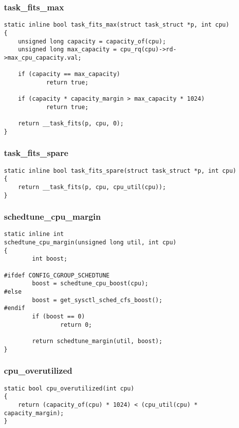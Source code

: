 \documentclass{article}
\begin{document}
\subsubsection{task\_fits\_max}

\begin{verbatim}
static inline bool task_fits_max(struct task_struct *p, int cpu)
{
    unsigned long capacity = capacity_of(cpu);
    unsigned long max_capacity = cpu_rq(cpu)->rd->max_cpu_capacity.val;

    if (capacity == max_capacity)
            return true;

    if (capacity * capacity_margin > max_capacity * 1024)
            return true;

    return __task_fits(p, cpu, 0);
}
\end{verbatim}

\subsubsection{task\_fits\_spare}

\begin{verbatim}
static inline bool task_fits_spare(struct task_struct *p, int cpu)
{
    return __task_fits(p, cpu, cpu_util(cpu));
}
\end{verbatim}

\subsubsection{schedtune\_cpu\_margin}

\begin{verbatim}
static inline int
schedtune_cpu_margin(unsigned long util, int cpu)
{
        int boost;

#ifdef CONFIG_CGROUP_SCHEDTUNE
        boost = schedtune_cpu_boost(cpu);
#else
        boost = get_sysctl_sched_cfs_boost();
#endif
        if (boost == 0)
                return 0;

        return schedtune_margin(util, boost);
}
\end{verbatim}


\subsubsection{cpu\_overutilized}

\begin{verbatim}
static bool cpu_overutilized(int cpu)
{
    return (capacity_of(cpu) * 1024) < (cpu_util(cpu) * capacity_margin);
}
\end{verbatim}
\end{document}
